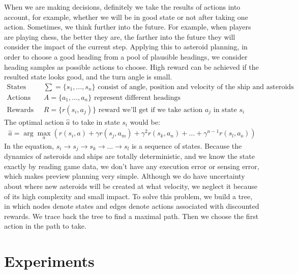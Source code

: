 \documentclass[10pt,draft,conference]{IEEEtran}
\begin{document}
When we are making decisions, definitely we take the results of actions into account, for example, whether we will be in good state or not after taking one action. Sometimes, we think further into the future. For example, when players are playing chess, the better they are, the farther into the future they will consider the impact of the current step. Applying this to asteroid planning, in order to choose a good heading from a pool of plausible headings, we consider heading samples as possible actions to choose. High reward can be achieved if the resulted state looks good, and the turn angle is small. 
\begin{equation} \nonumber
\begin{split}
\text{States\ \ \ \ }\ &\sum = \{s_1,..., s_n\}  \text{\ \ \ \ consist of angle, position and velocity of the ship and asteroids} \\
\text{Actions\ \ \ \ }\; &A = \{a_1,..., a_n\} \text{\ \ \ \ \ \ represent different headings} \\
\text{Rewards\ \ \ \ }\; &R = \{r(s_i, a_j)\} \text{\ \ \ \ \ \ \ reward we'll get if we take action $a_j$ in state $s_i$}
\end{split}
\end{equation}
The optimal action $\hat{a}$ to take in state $s_i$ would be:
\begin{equation} \nonumber
\begin{split}
\hat{a} = \arg\max_{a} \left ( r(s_i, a) + \gamma r(s_j, a_m) + \gamma^2 r(s_k, a_n) + ... + \gamma^{n-1} r(s_l, a_o) \right ) 
\end{split}
\end{equation}
In the equation, $s_i \rightarrow s_j \rightarrow s_k \rightarrow ... \rightarrow  s_l$ is a sequence of states.
Because the dynamics of asteroids and ships are totally deterministic, and we know the state exactly by reading game data, we don't have any execution error or sensing error, which makes preview planning very simple. Although we do have uncertainty about where new asteroids will be created at what velocity, we neglect it because of its high complexity and small impact. To solve this problem, we build a tree, in which nodes denote states and edges denote actions associated with discounted rewards. We trace back the tree to find a maximal path. Then we choose the first action in the path to take. 

\section{Experiments}
\end{document}
